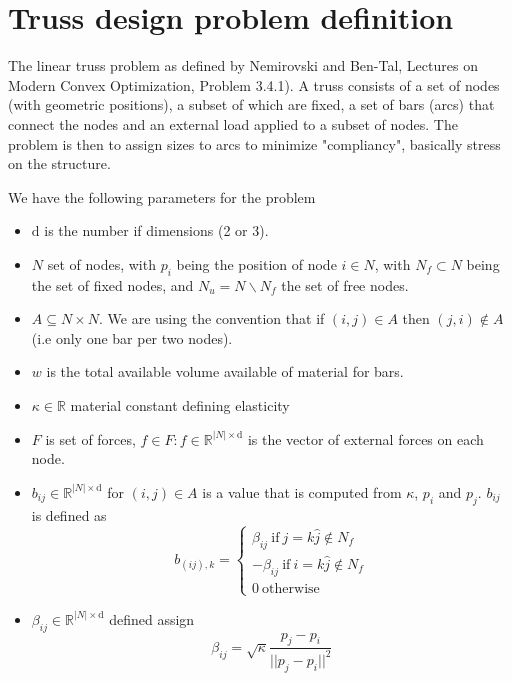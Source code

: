 \documentclass{article}
\begin{document}
\section{Truss design problem definition}

The linear truss problem as defined by Nemirovski and Ben-Tal,
Lectures on Modern Convex Optimization, Problem 3.4.1). A truss consists of a
set of nodes (with geometric positions), a subset of which are fixed, a set of
bars (arcs) that connect
the nodes and an external load applied to a subset of nodes. The problem is
then to assign sizes to arcs to minimize "compliancy", basically stress on the
structure.

We have the following parameters for the problem
\begin{itemize}
\item $\mathrm{d}$ is the number if dimensions (2 or 3).
\item $N$ set of nodes, with $p_i$ being the position of node $i\in N$, with
    $N_f\subset N$ being the set of fixed nodes, and $N_u=N\backslash N_f$ the
        set of free nodes.
\item $A\subseteq N\times N$. We are using the convention that if $(i,j)\in A$
    then $(j,i)\not\in A$ (i.e only one bar per two nodes). 
\item $w$ is the total available volume available of material for bars.
\item $\kappa\in\mathbb{R}$ material constant defining elasticity
\item $F$ is set of forces, $f\in F: f\in\mathbb{R}^{|N|\times\mathrm{d}}$ is the vector of external forces on each node.
\item $b_{ij}\in\mathbb{R}^{|N|\times\mathrm{d}}$ for $(i,j)\in A$ is a value that is computed from $\kappa$, $p_i$ and $p_j$. $b_{ij}$ is defined as 
    \[
        b_{(ij),k} = \left\{ 
            \begin{array}{l}
                \beta_{ij}\ \mathrm{ if }\ j = k\hat j\not\in N_f \\
                -\beta_{ij}\ \mathrm{ if }\ i = k\hat j\not\in N_f \\
                0\  \mathrm{ otherwise}
            \end{array}
        \right.
    \]
\item $\beta_{ij}\in\mathbb{R}^{|N|\times\mathrm{d}}$ defined assign
    \[
        \beta_{ij} = \sqrt\kappa \frac{p_j-p_i}{||p_j-p_i||^2}
    \]
\end{itemize}
\end{document}
